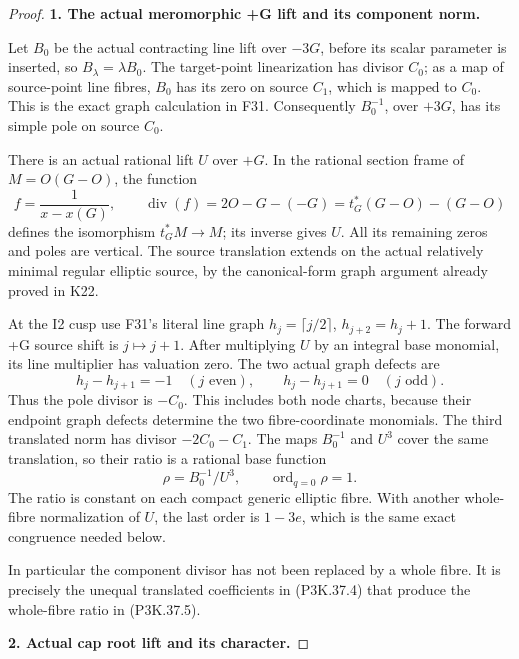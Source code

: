 \begin{proof}
\par\medskip\noindent\textbf{1. The actual meromorphic +G lift and its component norm.}\enspace

Let \(B_0\) be the actual contracting line lift over \(-3G\), before
its scalar parameter is inserted, so \(B_\lambda=\lambda B_0\).
The target-point linearization has divisor \(C_0\); as a map of
source-point line fibres, \(B_0\) has its zero on source \(C_1\),
which is mapped to \(C_0\). This is the exact graph calculation in F31.
Consequently \(B_0^{-1}\), over \(+3G\), has its simple pole on
source \(C_0\).

There is an actual rational lift \(U\) over \(+G\). In the rational
section frame of \(M=O(G-O)\), the function
\[
 f=\frac1{x-x(G)},\qquad
 \operatorname{div}(f)=2O-G-(-G)
       =t_G^*(G-O)-(G-O)
\]
defines the isomorphism \(t_G^*M\to M\); its inverse gives \(U\).
All its remaining zeros and poles are vertical. The source translation
extends on the actual relatively minimal regular elliptic source, by the
canonical-form graph argument already proved in K22.

At the I2 cusp use F31's literal line graph
\(h_j=\lceil j/2\rceil\), \(h_{j+2}=h_j+1\).
The forward +G source shift is \(j\mapsto j+1\). After multiplying
\(U\) by an integral base monomial, its line multiplier has valuation
zero. The two actual graph defects are
\[
 h_j-h_{j+1}=-1\quad(j\text{ even}),\qquad
 h_j-h_{j+1}=0\quad(j\text{ odd}).                              \tag{P3K.37.4}
\]
Thus the pole divisor is \(-C_0\). This includes both node charts,
because their endpoint graph defects determine the two fibre-coordinate
monomials. The third translated norm has divisor \(-2C_0-C_1\).
The maps \(B_0^{-1}\) and \(U^3\) cover the same translation,
so their ratio is a rational base function
\[
 \rho=B_0^{-1}/U^3,\qquad \operatorname{ord}_{q=0}\rho=1.         \tag{P3K.37.5}
\]
The ratio is constant on each compact generic elliptic fibre. With another
whole-fibre normalization of \(U\), the last order is \(1-3e\),
which is the same exact congruence needed below.

In particular the component divisor has not been replaced by a whole fibre.
It is precisely the unequal translated coefficients in (P3K.37.4) that produce
the whole-fibre ratio in (P3K.37.5).

\par\medskip\noindent\textbf{2. Actual cap root lift and its character.}\enspace


\end{proof}
